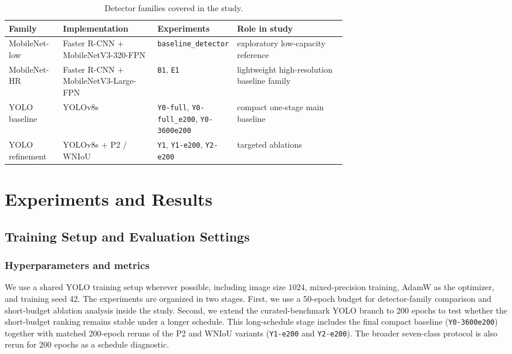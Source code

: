 \documentclass[journal,article,submit,moreauthors,pdftex]{Definitions/tsp}
\begin{document}
\begin{table}[t]
  \centering
  \caption{Detector families covered in the study.}
  \label{tab:detector-families}
  \footnotesize
  \setlength{\tabcolsep}{4pt}
  \begin{tabularx}{\linewidth}{>{\raggedright\arraybackslash}p{0.16\linewidth} >{\raggedright\arraybackslash}p{0.28\linewidth} >{\raggedright\arraybackslash}p{0.23\linewidth} X}
    \toprule
    Family & Implementation & Experiments & Role in study \\
    \midrule
    MobileNet-low & Faster R-CNN + MobileNetV3-320-FPN & \texttt{baseline\_detector} & exploratory low-capacity reference \\
    MobileNet-HR & Faster R-CNN + MobileNetV3-Large-FPN & \texttt{B1}, \texttt{E1} & lightweight high-resolution baseline family \\
    YOLO baseline & YOLOv8s & \texttt{Y0-full}, \texttt{Y0-full\_e200}, \texttt{Y0-3600e200} & compact one-stage main baseline \\
    YOLO refinement & YOLOv8s + P2 / WNIoU & \texttt{Y1}, \texttt{Y1-e200}, \texttt{Y2-e200} & targeted ablations \\
    \bottomrule
  \end{tabularx}
\end{table}



\section{Experiments and Results}
\label{sec:experiments}

\subsection{Training Setup and Evaluation Settings}
\label{sec:training}

\subsubsection{Hyperparameters and metrics}
We use a shared YOLO training setup wherever possible, including image size $1024$, mixed-precision training, AdamW as the optimizer, and training seed 42. The experiments are organized in two stages. First, we use a 50-epoch budget for detector-family comparison and short-budget ablation analysis inside the study. Second, we extend the curated-benchmark YOLO branch to 200 epochs to test whether the short-budget ranking remains stable under a longer schedule. This long-schedule stage includes the final compact baseline (\texttt{Y0-3600e200}) together with matched 200-epoch reruns of the P2 and WNIoU variants (\texttt{Y1-e200} and \texttt{Y2-e200}). The broader seven-class protocol is also rerun for 200 epochs as a schedule diagnostic.
\end{document}
